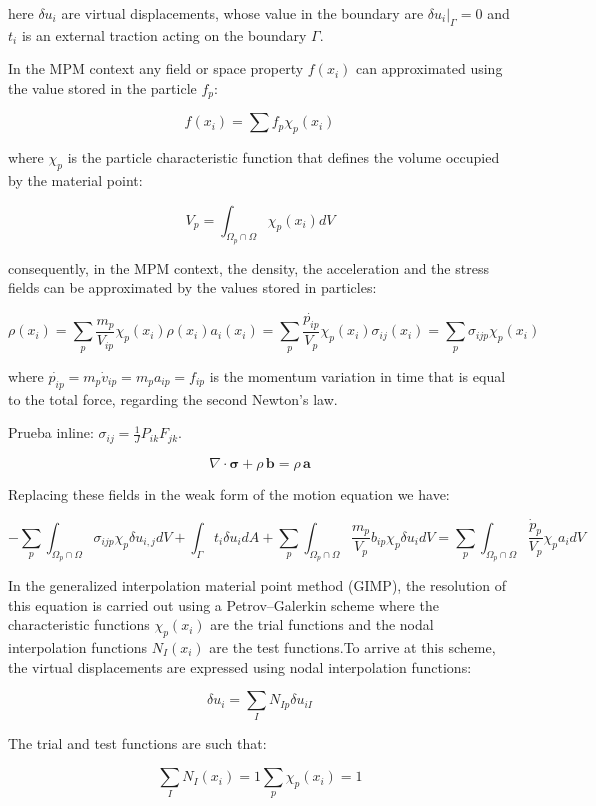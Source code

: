 \documentclass[11pt,a4paper]{article}
\begin{document}
here $\delta u_i$ are virtual displacements, whose value in the boundary are $\delta u_i |_{\Gamma} = 0$ and $t_i$ is an external traction acting on the boundary $\Gamma$.

In the MPM context any field or space property $f(x_i)$ can approximated using the value stored in the particle $f_p$:

$$ f(x_i) = \sum f_p \chi_p (x_i) $$

where $\chi_p$ is the particle characteristic function that defines the volume occupied by the material point:

$$ V_p = \int_{\Omega_p \cap \Omega} \chi_p(x_i) dV $$

consequently, in the MPM context, the density, the acceleration and the stress fields can be approximated by the values stored in particles:

$$ \rho(x_i) = \sum_p \frac{m_p}{V_{ip}} \chi_p(x_i) \rho(x_i) a_i(x_i) = \sum_p \frac{\dot{p_{ip}}}{V_p} \chi_p(x_i) \sigma_{i j}(x_i) = \sum_p \sigma_{i j p} \chi_p(x_i) $$

where $\dot{p_{ip}} = m_p \dot{v}_{ip} = m_p a_{ip} = f_{ip}$ is the momentum variation in time that is equal to the total force, regarding the second Newton's law. 

Prueba inline: $ \sigma_{ij} = \frac{1}{J} P_{ik} F_{jk} $.

$$
\nabla \cdot \boldsymbol{\sigma} + \rho\,\mathbf{b} = \rho\,\mathbf{a}
$$

Replacing these fields in the weak form of the motion equation we have:

$$ -\sum_p \int_{\Omega_p \cap \Omega} \sigma_{i j p} \chi_p \delta u_{i, j} dV  + \int_{\Gamma} t_i \delta u_i dA+ \sum_p \int_{\Omega_p \cap \Omega} \frac{m_p}{V_p} b_{i p} \chi_p \delta u_i dV 
= \sum_p \int_{\Omega_p \cap \Omega} \frac{\dot{p}_p}{V_p} \chi_p a_i dV $$

In the generalized interpolation material point method (GIMP), the resolution of this equation is carried out using a Petrov–Galerkin scheme where the characteristic functions $\chi_p(x_i)$ are the trial functions and the nodal interpolation functions $N_I(x_i)$ are the test functions.To arrive at this scheme, the virtual displacements are expressed using nodal interpolation functions:

$$ \delta u_i=\sum_I N_{I p} \delta u_{i I} $$

The trial and test functions are such that:

$$ \sum_I N_{I}(x_i) = 1 \sum_p \chi_p(x_i) = 1 $$
\end{document}

